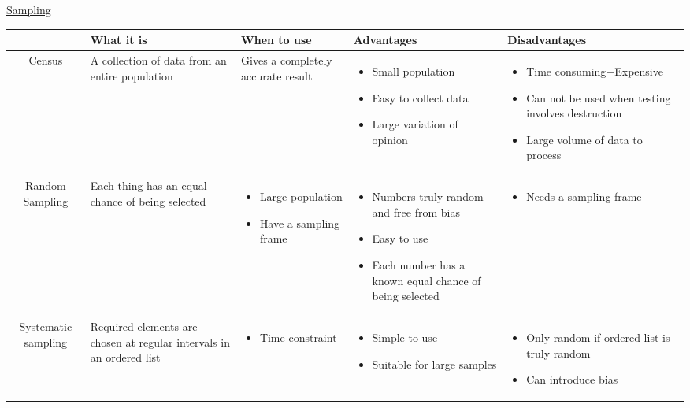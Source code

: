\documentclass{article}[5pt]
\begin{document}
\begin{center}
\underline{\huge Sampling}
\end{center}
\begin{tabularx}{\textwidth}{|c|X|X|X|X|}
\hline
&What it is&When to use&Advantages&Disadvantages\\
\hline
Census&A collection of data from an entire population&Gives a completely accurate result&
\begin{itemize}
\item Small population
\item Easy to collect data
\item Large variation of opinion
\end{itemize}&

\begin{itemize}
\item Time consuming+Expensive
\item Can not be used when testing involves destruction
\item Large volume of data to process
\end{itemize}\\
\hline


Random Sampling
&Each thing has an equal chance of being selected&

\begin{itemize}
\item Large population
\item Have a sampling frame
\end{itemize}&

\begin{itemize}
\item Numbers truly random and free from bias
\item Easy to use
\item Each number has a known equal chance of being selected
\end{itemize}&
\begin{itemize}
\item Needs a sampling frame
\end{itemize}\\
\hline


Systematic sampling
&Required elements are chosen at regular intervals in an ordered list&
\begin{itemize}
\item Time constraint
\end{itemize}&

\begin{itemize}
\item Simple to use
\item Suitable for large samples
\end{itemize}&
\begin{itemize}
\item Only random if ordered list is truly random
\item Can introduce bias
\end{itemize}\\
\hline



\end{tabularx}
\end{document}
